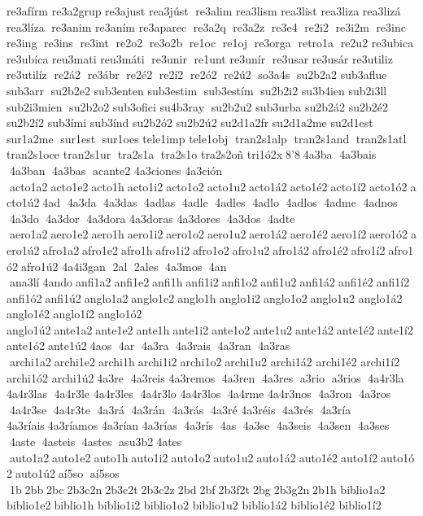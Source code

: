  re3afírm 
 re3a2grup 	 re3ajust 
 rea3júst  re3alim 	 rea3lism 	 rea3list 	 rea3liza 
 rea3lizá 
 rea3líza  re3anim 	 re3aním 
 re3aparec  re3a2q  re3a2z  re3e4  re2i2  re3i2m  re3inc  re3ing  re3ins  re3int  re2o2  re3o2b  re1oc  re1oj  re3orga  retro1a  re2u2 	 re3ubica 
 re3ubíca 	 reu3mati 
 reu3máti  re3unir  re1unt 	 re3unír  re3usar 	 re3usár 
 re3utiliz  re3utilíz  re2á2  re3ábr  re2é2  re2í2  re2ó2  re2ú2  so3a4s  su2b2a2 
 sub3aflue  sub3arr  su2b2e2 
 sub3enten 
 sub3estim  sub3estím  su2b2i2 	 su3b4ien 	 sub2i3ll  sub2i3mien  su2b2o2 
 sub3ofici 	 su4b3ray  su2b2u2 	 sub3urba 	 su2b2á2 	 su2b2é2 	 su2b2í2 	 sub3ími 	 sub3índ 	 su2b2ó2 	 su2b2ú2 
 su2d1a2fr 
 su2d1a2me 	 su2d1est 	 sur1a2me  sur1est  sur1oes 	 tele1imp 	 tele1obj  tran2s1alp  tran2s1and  tran2s1atl  tran2s1oce 
 tran2s1ur  tra2s1a  tra2s1o 
 tra2s2oñ 	 tri1ó2x 8'8 4a3ba  4a3bais  4a3ban  4a3bas  acante2 
4a3ciones  	4a3ción  acto1a2 acto1e2 acto1h acto1i2 acto1o2 acto1u2 acto1á2 acto1é2 acto1í2 acto1ó2 acto1ú2 4ad  4a3da  4a3das  4adlas  4adle  4adles  4adlo  4adlos  4adme  4adnos  4a3do  4a3dor  4a3dora  	4a3doras  	4a3dores  4a3dos  4adte  aero1a2 aero1e2 aero1h aero1i2 aero1o2 aero1u2 aero1á2 aero1é2 aero1í2 aero1ó2 aero1ú2 afro1a2 afro1e2 afro1h afro1i2 afro1o2 afro1u2 afro1á2 afro1é2 afro1í2 afro1ó2 afro1ú2 	4a4i3gan  2al  2ales  4a3mos  4an  ana3lí 4ando anfi1a2 anfi1e2 anfi1h anfi1i2 anfi1o2 anfi1u2 anfi1á2 anfi1é2 anfi1í2 anfi1ó2 anfi1ú2 anglo1a2 anglo1e2 anglo1h anglo1i2 anglo1o2 anglo1u2 	anglo1á2 	anglo1é2 	anglo1í2 	anglo1ó2 	anglo1ú2 ante1a2 ante1e2 ante1h ante1i2 ante1o2 ante1u2 ante1á2 ante1é2 ante1í2 ante1ó2 ante1ú2 4aos  4ar  4a3ra  4a3rais  4a3ran  4a3ras  archi1a2 archi1e2 archi1h archi1i2 archi1o2 archi1u2 	archi1á2 	archi1é2 	archi1í2 	archi1ó2 	archi1ú2 4a3re  4a3reis  	4a3remos  4a3ren  4a3res  a3rio  a3rios  4a4r3la  	4a4r3las  4a4r3le  	4a4r3les  4a4r3lo  	4a4r3los  4a4rme  	4a4r3nos  4a3ron  4a3ros  4a4r3se  4a4r3te  4a3rá  4a3rán  4a3rás  4a3ré  	4a3réis  4a3rés  4a3ría  	4a3ríais 4a3ríamos  	4a3rían  	4a3rías  4a3rís  4as  4a3se  4a3seis  4a3sen  4a3ses  4aste  4asteis  4astes  asu3b2 4ates  auto1a2 auto1e2 auto1h auto1i2 auto1o2 auto1u2 auto1á2 auto1é2 auto1í2 auto1ó2 auto1ú2 aí5so  aí5sos  1b 2bb 2bc 2b3c2n 2b3c2t 2b3c2z 2bd 2bf 2b3f2t 2bg 2b3g2n 2b1h 	biblio1a2 	biblio1e2 biblio1h 	biblio1i2 	biblio1o2 	biblio1u2 
biblio1á2 
biblio1é2 
biblio1í2 
